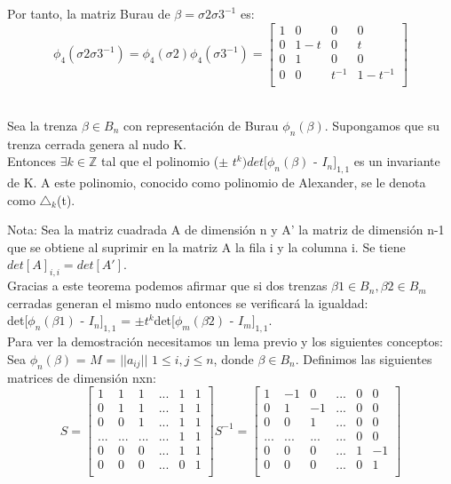  Por tanto, la matriz Burau de $\beta = \sigma2\sigma3^{-1}$ es:
 \[ \phi_{4} (\sigma2\sigma3^{-1}) = \phi_{4} (\sigma2) \phi_{4}(\sigma3^{-1}) = \begin{bmatrix}
 1 & 0 & 0 & 0 \\
 0 & 1-t & 0 & t \\
 0 & 1 & 0 & 0  \\	
 0 & 0 & t^{-1} & 1-t^{-1} \\
 \end{bmatrix}\]\\
 
 
\begin{teo}\label{teoalex}
	Sea la trenza $\beta \in B_{n}$ con representación de Burau $\phi_{n}(\beta)$. Supongamos que su trenza cerrada genera al nudo K.\\
    Entonces $\exists k \in \mathds{Z}$ tal que el polinomio ($ \pm $ $ t^{k} )det[\phi_{n}(\beta)$ - $ I_{n} $$ ]_{1,1} $ es un invariante de K. A este polinomio, conocido como polinomio de Alexander, se le denota como $ \triangle_{k} $(t).
\end{teo}

Nota: Sea la matriz cuadrada A de dimensión n y A' la matriz de dimensión n-1 que se obtiene al suprimir en la matriz A la fila i y la columna i. 
Se tiene $ det[A]_{i,i}=det[A'] $.\\ 

Gracias a este teorema podemos afirmar que si dos trenzas $\beta1 \in B_{n}, \beta2 \in B_{m}$ cerradas generan el mismo nudo entonces se verificará la igualdad:\\
det[$\phi_{n}(\beta1)$ - $ I_{n} $$ ]_{1,1}$ = $ \pm t^{k} $det[$\phi_{m}(\beta2)$ - $ I_{m} $$ ]_{1,1}$.\\

Para ver la demostración necesitamos un lema previo y los siguientes conceptos:\\

\newpage
Sea $\phi_{n}(\beta)$ = $M$ = $||a_{ij}||$ $1 \le i,j \le n$, donde $\beta \in B_{n}$. Definimos las siguientes matrices de dimensión nxn:\\
  \[ S = \begin{bmatrix}
  1 & 1 & 1 &... & 1 & 1 \\
  0 & 1 & 1 &... & 1 & 1\\
  0 & 0 & 1 &... & 1 & 1 \\
  ... & ... & ...& ... & 1 & 1 \\	
  0 & 0 & 0 & ... & 1 & 1\\	
  0 & 0 & 0 & ... & 0 & 1\\
  \end{bmatrix} 
  S^{-1} = \begin{bmatrix}
  1 & -1 & 0 & ... & 0 & 0 \\
  0 & 1 & -1 & ... & 0 & 0\\
  0 & 0 & 1 & ... & 0  & 0\\
  ... & ... & ...& ... & 0 & 0  \\	
  0 & 0 & 0 &...& 1 & -1  \\	
  0 & 0 & 0 & ... & 0 & 1 \\
  \end{bmatrix}\]\\
  

